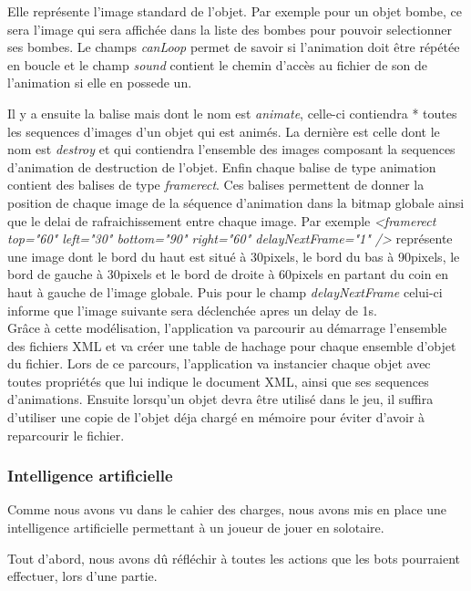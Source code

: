 			Elle représente l'image standard de l'objet.
			Par exemple pour un objet bombe, ce sera l'image qui sera affichée dans la liste des bombes 
			pour pouvoir selectionner ses bombes.
			Le champs \textit{canLoop} permet de savoir si l'animation doit être répétée en boucle 
			et le champ \textit{sound} contient le chemin d'accès au fichier de son de l'animation 
			si elle en possede un.
			
			Il y a ensuite la balise mais dont le nom est \textit{animate}, celle-ci contiendra *
			toutes les sequences d'images d'un objet qui est animés.
			La dernière est celle dont le nom est \textit{destroy} et qui contiendra 
			l'ensemble des images composant la sequences d'animation de destruction de l'objet.
			Enfin chaque balise de type animation contient des balises de type \textit{framerect}.
			Ces balises permettent de donner la position de chaque image de la séquence d'animation
			dans la bitmap globale ainsi que le delai de rafraichissement entre chaque image.
			Par exemple \textit{<framerect top="60" left="30" bottom="90" right="60" delayNextFrame="1" />}
			représente une image dont le bord du haut est situé à 30pixels, le bord du bas à 90pixels, 
			le bord de gauche à 30pixels et le bord de droite à 60pixels en partant du coin en haut à 
			gauche de l'image globale.
			Puis pour le champ \textit{delayNextFrame} celui-ci informe que l'image suivante sera déclenchée 
			apres un delay de 1s.\\
		
			Grâce à cette modélisation, l'application va parcourir au démarrage l'ensemble des fichiers 
			XML et va créer une table de hachage pour chaque ensemble d'objet du fichier.
			Lors de ce parcours, l'application va instancier chaque objet avec toutes propriétés 
			que lui indique le document XML, ainsi que ses sequences d'animations.
			Ensuite lorsqu'un objet devra être utilisé dans le jeu, il suffira d'utiliser 
			une copie de l'objet déja chargé en mémoire pour éviter d'avoir à reparcourir le fichier.
			
			
	\subsubsection{Intelligence artificielle}
	
		Comme nous avons vu dans le cahier des charges, nous avons mis en 
		place une intelligence artificielle permettant à un joueur de jouer 
		en solotaire.
	
		Tout d'abord, nous avons dû réfléchir à toutes les actions que les 
		\glspl{bot} pourraient effectuer, lors d'une partie.
		
